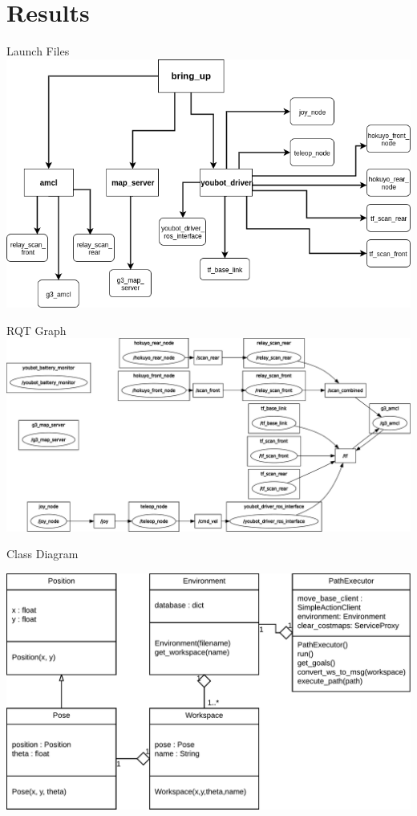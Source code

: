 \documentclass[12pt,aspectratio=43,xcolor={usenames,dvipsnames,table}]{beamer}
\begin{document}
\section{Results}
\begin{frame}{Launch Files}
    \centering
    \includegraphics[width=\textwidth]{gfx/launchfile.png}
\end{frame}
\begin{frame}{RQT Graph}
    \centering
    \includegraphics[width=\textwidth]{gfx/rosgraph}
\end{frame}

\begin{frame}{Class Diagram}
    \begin{center}
        \includegraphics[width=\linewidth,height=0.9\textheight,keepaspectratio]{gfx/01.pdf}
    \end{center}
\end{frame}
\end{document}
